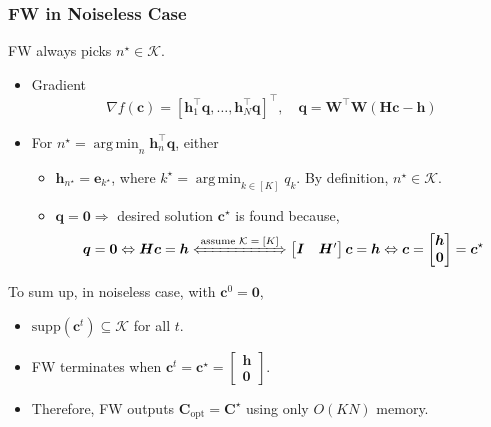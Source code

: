 \documentclass[10pt,xcolor={usenames,dvipsnames,table}]{beamer}
\newcommand{\T}{\!\top\!}
\DeclareMathOperator*{\argmin}{arg\,min}
\begin{document}
\begin{frame}[label=fine]
    \frametitle{FW in Noiseless Case}
    \begin{block}
        
    FW always picks $n^{\star} \in \mathcal{K}$.
    \end{block}
    \begin{itemize}
        \item Gradient
    \begin{equation*}
        \nabla f(\mathbf{c}) 
        = [\bm{h}_1^{\T}\bm{q}, \ldots , \bm{h}_N^{\T}\bm{q}]^{\T}, \quad \bm{q} = \bm{W}^{\T}\bm{W}(\bm{H}\bm{c}-\bm{h})
    \end{equation*}
    \item For $n^{\star} = \argmin_{n} \bm{h}_n^{\T}\bm{q}$, either
    \begin{itemize}
        \item $\bm{h}_{n^{\star}} = \bm{e}_{k^{\star}}$, where $k^{\star} = \argmin_{k \in [K]} q_k$. By definition, $n^{\star} \in \mathcal{K}$.
        \item $\bm{q} = \bm{0} \Rightarrow$ desired solution $\bm{c}^{\star}$  is found because, 
            \[
            \bm{q} = \bm{0} \Leftrightarrow
            \bm{H}\bm{c} = \bm{h} 
            \xLeftrightarrow{\text{assume $\mathcal{K}=[K]$}}
            \begin{bmatrix}
                \bm{I} & \bm{H}'
            \end{bmatrix}  \bm{c} = \bm{h}
            \Leftrightarrow 
            \bm{c} = \begin{bmatrix}
            \bm{h} \\ \bm{0}
            \end{bmatrix} =\bm{c}^{\star}
            \] 
    \end{itemize}
    \end{itemize}

    To sum up, in noiseless case, with $\bm{c}^{0} = \bm{0}$,
    \begin{itemize}
        \item $\text{supp}(\bm{c}^{t}) \subseteq \mathcal{K}$ for all $t$.
        \item FW terminates when $\bm{c}^{t} = \bm{c}^{\star} = \begin{bmatrix}
        \bm{h} \\ \bm{0}
        \end{bmatrix}$.
    \item Therefore, FW outputs $\bm{C}_{\text{opt}} = \bm{C}^{\star}$ using only $O(KN)$ memory.
    \end{itemize}
    

\end{frame}
\end{document}

